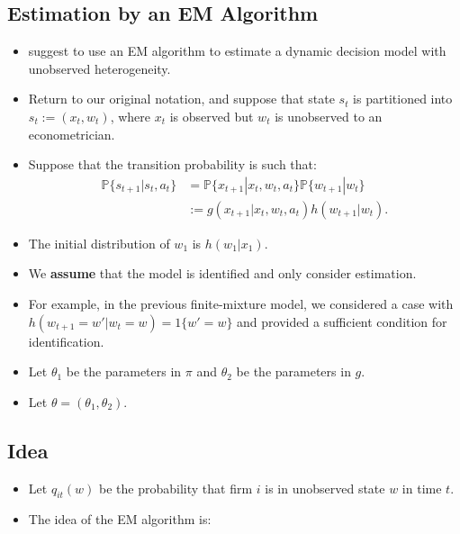 \documentclass[]{book}
\providecommand{\tightlist}{%
  \setlength{\itemsep}{0pt}\setlength{\parskip}{0pt}}
\begin{document}
\subsection{Estimation by an EM
Algorithm}\label{estimation-by-an-em-algorithm}

\begin{itemize}
\tightlist
\item
  \citet{arcidiaconoConditionalChoiceProbability2011} suggest to use an
  EM algorithm to estimate a dynamic decision model with unobserved
  heterogeneity.
\item
  Return to our original notation, and suppose that state \(s_t\) is
  partitioned into \(s_t := (x_t, w_t)\), where \(x_t\) is observed but
  \(w_t\) is unobserved to an econometrician.
\item
  Suppose that the transition probability is such that: \[
  \begin{split}
  \mathbb{P}\{s_{t + 1}|s_t, a_t\} &= \mathbb{P}\{x_{t + 1}|x_t, w_t, a_t\} \mathbb{P}\{w_{t + 1}|w_t\} \\
  &:= g(x_{t + 1}|x_t, w_t, a_t) h(w_{t + 1}|w_t).
  \end{split}
  \]
\item
  The initial distribution of \(w_1\) is \(h(w_1|x_1)\).
\item
  We \textbf{assume} that the model is identified and only consider
  estimation.
\item
  For example, in the previous finite-mixture model, we considered a
  case with \(h(w_{t + 1} = w'|w_{t} = w) = 1\{w' = w\}\) and provided a
  sufficient condition for identification.
\item
  Let \(\theta_1\) be the parameters in \(\pi\) and \(\theta_2\) be the
  parameters in \(g\).
\item
  Let \(\theta = (\theta_1, \theta_2)\).
\end{itemize}

\subsection{Idea}\label{idea}

\begin{itemize}
\tightlist
\item
  Let \(q_{it}(w)\) be the probability that firm \(i\) is in unobserved
  state \(w\) in time \(t\).
\item
  The idea of the EM algorithm is:
\end{itemize}
\end{document}
